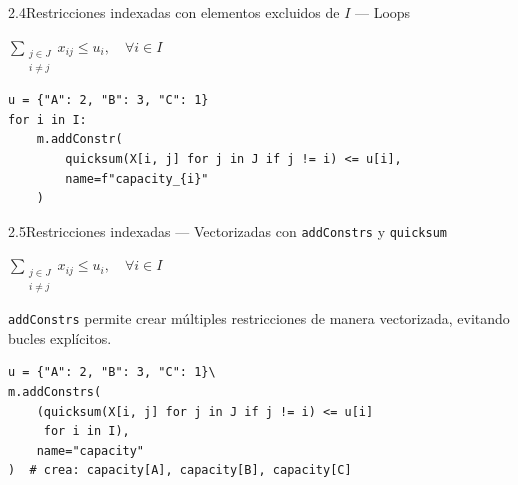 \documentclass[10pt,a4paper]{article}
\newlength{\mathcolw}
\newlength{\codecolw}
\newcommand{\entryheader}[1]{%
  \needspace{5cm}%
  \vspace{6pt}%
  \noindent%
  \begin{tcolorbox}[
    colback=subsecbg!18,
    colframe=subsecbg!45,
    sharp corners, boxrule=0.4pt,
    left=5pt, right=5pt, top=2pt, bottom=2pt,
    fontupper=\small\bfseries\sffamily,
  ]
  #1
  \end{tcolorbox}%
  \vspace{2pt}%
}
\newcommand{\py}[1]{\texttt{\small #1}}
\begin{document}
\vspace{4pt}

\entryheader{2.4\quad Restricciones indexadas con elementos excluidos de $I$ --- Loops}
\noindent
\begin{minipage}[t]{\mathcolw}
    \begin{tcolorbox}[mathbox]
        $\displaystyle\sum_{\substack{j \in J \\ i \neq j}} x_{ij} \leq u_i, \quad \forall i \in I$
    \end{tcolorbox}
\end{minipage}\hspace{0.02\textwidth}%
\begin{minipage}[t]{\codecolw}
    \begin{lstlisting}[style=gurobipy]
u = {"A": 2, "B": 3, "C": 1}
for i in I:
    m.addConstr(
        quicksum(X[i, j] for j in J if j != i) <= u[i],
        name=f"capacity_{i}"
    )
\end{lstlisting}
\end{minipage}

\vspace{4pt}

\entryheader{2.5\quad Restricciones indexadas --- Vectorizadas con \py{addConstrs} y \py{quicksum}}
\noindent
\begin{minipage}[t]{\mathcolw}
    \begin{tcolorbox}[mathbox]
        $\displaystyle\sum_{\substack{j \in J \\ i \neq j}} x_{ij} \leq u_i, \quad \forall i \in I$
    \end{tcolorbox}
    \vspace{2pt}
    \begin{tcolorbox}[notebox]
        \py{addConstrs} permite crear múltiples restricciones de manera vectorizada, evitando bucles explícitos.
    \end{tcolorbox}
\end{minipage}\hspace{0.02\textwidth}%
\begin{minipage}[t]{\codecolw}
    \begin{lstlisting}[style=gurobipy]
u = {"A": 2, "B": 3, "C": 1}\
m.addConstrs(
    (quicksum(X[i, j] for j in J if j != i) <= u[i]
     for i in I),
    name="capacity"
)  # crea: capacity[A], capacity[B], capacity[C]
\end{lstlisting}
\end{minipage}

\vspace{4pt}
\end{document}
